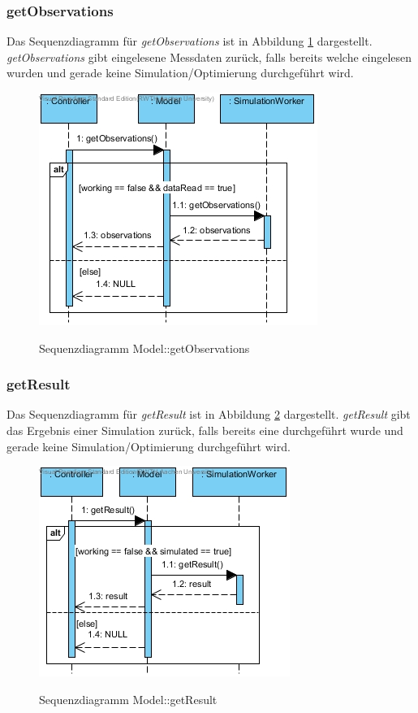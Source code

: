 \subsubsection*{getObservations}

Das Sequenzdiagramm für \emph{getObservations} ist in Abbildung \ref{Sequenzdiagramm Model::getObservations} dargestellt. \emph{getObservations} gibt eingelesene Messdaten zurück, falls bereits welche eingelesen wurden und gerade keine Simulation/Optimierung durchgeführt wird.

\begin{figure}[H]
	\centering
	\includegraphics[scale=.85]{Bilder/Model__getObservations().jpg}\\
	\caption{Sequenzdiagramm Model::getObservations}
	\label{Sequenzdiagramm Model::getObservations}
\end{figure}

\subsubsection*{getResult}

Das Sequenzdiagramm für \emph{getResult} ist in Abbildung \ref{Sequenzdiagramm Model::getResult} dargestellt. \emph{getResult} gibt das Ergebnis einer Simulation zurück, falls bereits eine durchgeführt wurde und gerade keine Simulation/Optimierung durchgeführt wird.

\begin{figure}[H]
	\centering
	\includegraphics[scale=.85]{Bilder/Model__getResult().jpg}\\
	\caption{Sequenzdiagramm Model::getResult}
	\label{Sequenzdiagramm Model::getResult}
\end{figure}

